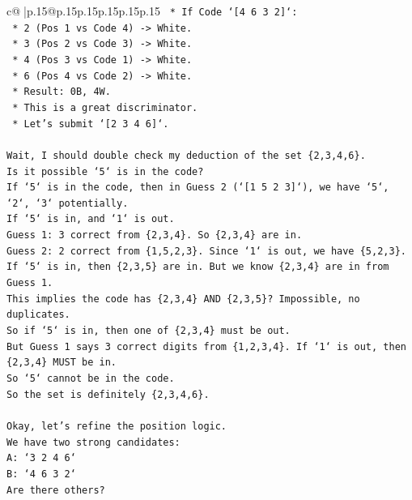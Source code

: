 \documentclass{article}
\begin{document}
{\begin{supertabular}{c@{$\;$}|p{.15\linewidth}@{}p{.15\linewidth}p{.15\linewidth}p{.15\linewidth}p{.15\linewidth}p{.15\linewidth}}
{{{\texttt{                *   If Code `{[}4 6 3 2{]}`:} \\
\texttt{                    *   2 (Pos 1 vs Code 4) {-}> White.} \\
\texttt{                    *   3 (Pos 2 vs Code 3) {-}> White.} \\
\texttt{                    *   4 (Pos 3 vs Code 1) {-}> White.} \\
\texttt{                    *   6 (Pos 4 vs Code 2) {-}> White.} \\
\texttt{                    *   Result: 0B, 4W.} \\
\texttt{            *   This is a great discriminator.} \\
\texttt{            *   Let's submit `{[}2 3 4 6{]}`.} \\
\\ 
\texttt{Wait, I should double check my deduction of the set \{2,3,4,6\}.} \\
\texttt{Is it possible `5` is in the code?} \\
\texttt{If `5` is in the code, then in Guess 2 (`{[}1 5 2 3{]}`), we have `5`, `2`, `3` potentially.} \\
\texttt{If `5` is in, and `1` is out.} \\
\texttt{Guess 1: 3 correct from \{2,3,4\}. So \{2,3,4\} are in.} \\
\texttt{Guess 2: 2 correct from \{1,5,2,3\}. Since `1` is out, we have \{5,2,3\}.} \\
\texttt{If `5` is in, then \{2,3,5\} are in. But we know \{2,3,4\} are in from Guess 1.} \\
\texttt{This implies the code has \{2,3,4\} AND \{2,3,5\}? Impossible, no duplicates.} \\
\texttt{So if `5` is in, then one of \{2,3,4\} must be out.} \\
\texttt{But Guess 1 says 3 correct digits from \{1,2,3,4\}. If `1` is out, then \{2,3,4\} MUST be in.} \\
\texttt{So `5` cannot be in the code.} \\
\texttt{So the set is definitely \{2,3,4,6\}.} \\
\\ 
\texttt{Okay, let's refine the position logic.} \\
\texttt{We have two strong candidates:} \\
\texttt{A: `3 2 4 6`} \\
\texttt{B: `4 6 3 2`} \\
\texttt{Are there others?} \\
}}}
\end{supertabular}}
\end{document}
